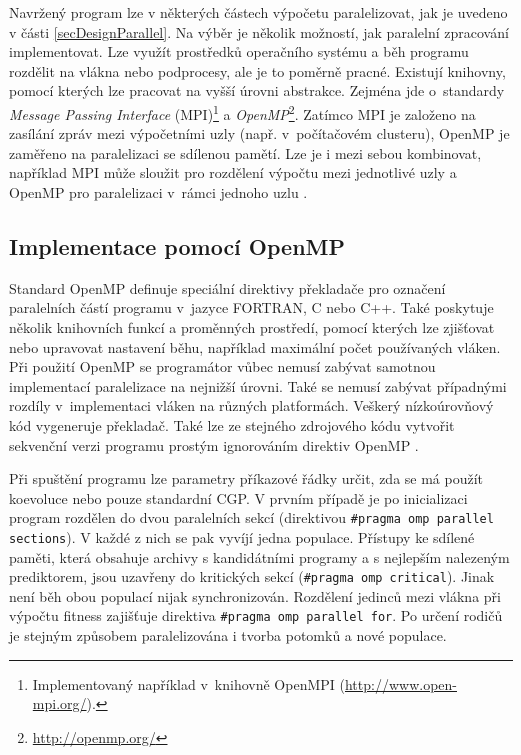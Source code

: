 Navržený program lze v některých částech výpočetu paralelizovat, jak je uvedeno v části \ref{secDesignParallel}. Na výběr je několik možností, jak paralelní zpracování implementovat. Lze využít prostředků operačního systému a běh programu rozdělit na vlákna nebo podprocesy, ale je to poměrně pracné. Existují knihovny, pomocí kterých lze pracovat na vyšší úrovni abstrakce. Zejména jde o~standardy \emph{Message Passing Interface} (MPI)\footnote{Implementovaný například v~knihovně OpenMPI (\url{http://www.open-mpi.org/}).} a \emph{OpenMP}\footnote{\url{http://openmp.org/}}. Zatímco MPI je založeno na zasílání zpráv mezi výpočetními uzly (např. v~počítačovém clusteru), OpenMP je zaměřeno na paralelizaci se sdílenou pamětí. Lze je i mezi sebou kombinovat, například MPI může sloužit pro rozdělení výpočtu mezi jednotlivé uzly a OpenMP pro paralelizaci v~rámci jednoho uzlu \cite{Quinn}.


\subsection{Implementace pomocí OpenMP}

Standard OpenMP definuje speciální direktivy překladače pro označení paralelních částí programu v~jazyce FORTRAN, C nebo C++. Také poskytuje několik knihovních funkcí a proměnných prostředí, pomocí kterých lze zjišťovat nebo upravovat nastavení běhu, například maximální počet používaných vláken. Při použití OpenMP se programátor vůbec nemusí zabývat samotnou implementací paralelizace na nejnižší úrovni. Také se nemusí zabývat případnými rozdíly v~implementaci vláken na různých platformách. Veškerý nízkoúrovňový kód vygeneruje překladač. Také lze ze stejného zdrojového kódu vytvořit sekvenční verzi programu prostým ignorováním direktiv OpenMP \cite{Quinn}.

Při spuštění programu lze parametry příkazové řádky určit, zda se má použít koevoluce nebo pouze standardní CGP. V prvním případě je po inicializaci program rozdělen do dvou paralelních sekcí (direktivou \texttt{\#pragma omp parallel sections}). V každé z nich se pak vyvíjí jedna populace. Přístupy ke sdílené paměti, která obsahuje archivy s kandidátními programy a s nejlepším nalezeným prediktorem, jsou uzavřeny do kritických sekcí (\texttt{\#pragma omp critical}). Jinak není běh obou populací nijak synchronizován. Rozdělení jedinců mezi vlákna při výpočtu fitness zajišťuje direktiva \texttt{\#pragma omp parallel for}. Po určení rodičů je stejným způsobem paralelizována i tvorba potomků a nové populace.

